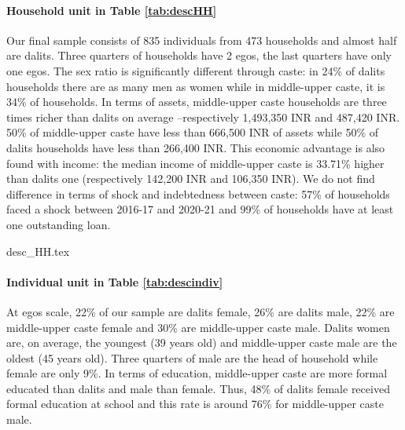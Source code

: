 \documentclass[a4paper, 11pt, onecolumn]{article}
\begin{document}
\paragraph{Household unit in Table \ref{tab:descHH}}
Our final sample consists of 835 individuals from 473 households and almost half are dalits.
Three quarters of households have 2 egos, the last quarters have only one egos.
The sex ratio is significantly different through caste: in 24\% of dalits households there are as many men as women while in middle-upper caste, it is 34\% of households.
In terms of assets, middle-upper caste households are three times richer than dalits on average --respectively 1,493,350 INR and 487,420 INR.
50\% of middle-upper caste have less than 666,500 INR of assets while 50\% of dalits households have less than 266,400 INR.
This economic advantage is also found with income: the median income of middle-upper caste is 33.71\% higher than dalits one (respectively 142,200 INR and 106,350 INR).
We do not find difference in terms of shock and indebtedness between caste: 57\% of households faced a shock between 2016-17 and 2020-21 and 99\% of households have at least one outstanding loan.
		
{desc_HH.tex}

\paragraph{Individual unit in Table \ref{tab:descindiv}}
At egos scale, 22\% of our sample are dalits female, 26\% are dalits male, 22\% are middle-upper caste female and 30\% are middle-upper caste male.
Dalits women are, on average, the youngest (39 years old) and middle-upper caste male are the oldest (45 years old).
Three quarters of male are the head of household while female are only 9\%.
In terms of education, middle-upper caste are more formal educated than dalits and male than female.
Thus, 48\% of dalits female received formal education at school and this rate is around 76\% for middle-upper caste male.
\end{document}
